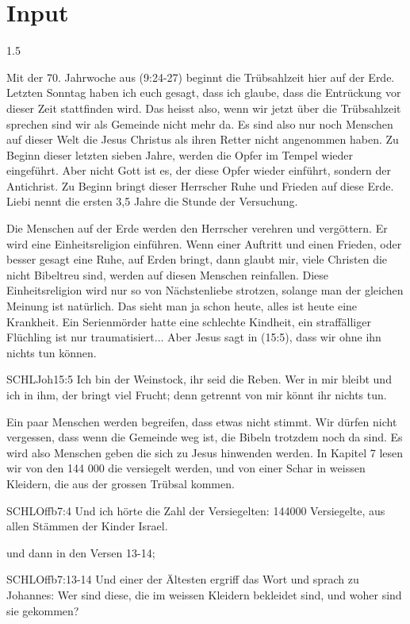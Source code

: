 \documentclass[14pt]{../../inc/mybib}
\begin{document}
\section{ Input }
\begin{spacing}{1.5}
    \begin{block}
        Mit der 70. Jahrwoche aus (9:24-27) beginnt die Trübsahlzeit hier auf der Erde. Letzten Sonntag haben ich euch gesagt, dass ich glaube, dass die Entrückung vor dieser Zeit stattfinden wird. Das heisst also, wenn wir jetzt über die Trübsahlzeit sprechen sind wir als Gemeinde nicht mehr da. Es sind also nur noch Menschen auf dieser Welt die Jesus Christus als ihren Retter nicht angenommen haben. Zu Beginn dieser letzten sieben Jahre, werden die Opfer im Tempel wieder eingeführt. Aber nicht Gott ist es, der diese Opfer wieder einführt, sondern der Antichrist. Zu Beginn bringt dieser Herrscher Ruhe und Frieden auf diese Erde. Liebi nennt die ersten 3,5 Jahre die Stunde der Versuchung. 
        
        Die Menschen auf der Erde werden den Herrscher verehren und vergöttern. Er wird eine Einheitsreligion einführen. Wenn einer Auftritt und einen Frieden, oder besser gesagt eine Ruhe, auf Erden bringt, dann glaubt mir, viele  Christen die nicht Bibeltreu sind, werden auf diesen Menschen reinfallen. Diese Einheitsreligion wird nur so von Nächstenliebe strotzen, solange man der gleichen Meinung ist natürlich. Das sieht man ja schon heute, alles ist heute eine Krankheit. Ein Serienmörder hatte eine schlechte Kindheit, ein straffälliger Flüchling ist nur traumatisiert... Aber Jesus sagt in (15:5), dass wir ohne ihn nichts tun können. 
        \begin{bibelbox}{SCHL}{Joh}{15:5}
            Ich bin der Weinstock, ihr seid die Reben. Wer in mir bleibt und ich in ihm, der bringt viel Frucht; denn getrennt von mir könnt ihr nichts tun.
        \end{bibelbox}
        Ein paar Menschen werden begreifen, dass etwas nicht stimmt. Wir dürfen nicht vergessen, dass wenn die Gemeinde weg ist, die Bibeln trotzdem noch da sind. Es wird also Menschen geben die sich zu Jesus hinwenden werden. In Kapitel 7 lesen wir von den 144 000 die versiegelt werden, und von einer Schar in weissen Kleidern, die aus der grossen Trübsal kommen. 
        \begin{bibelbox}{SCHL}{Offb}{7:4}
            Und ich hörte die Zahl der Versiegelten: 144000 Versiegelte, aus allen Stämmen der Kinder Israel.
        \end{bibelbox}
        und dann in den Versen 13-14;
        \begin{bibelbox}{SCHL}{Offb}{7:13-14}
            Und einer der Ältesten ergriff das Wort und sprach zu Johannes: Wer sind diese, die im weissen Kleidern bekleidet sind, und woher sind sie gekommen?


\end{bibelbox}
\end{block}
\end{spacing}
\end{document}
